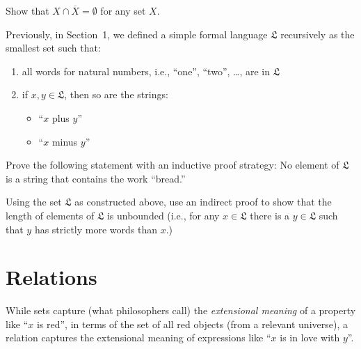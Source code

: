 \documentclass[nobib,nofonts]{tufte-handout}
\begin{document}
\bigskip
\noindent \colorbox{mygray}{\centering
  \begin{minipage}{1.0\textwidth}

    \begin{exercise}
      Show that $X \cap \overline{X} = \emptyset$ for any set $X$.
    \end{exercise}

    \begin{exercise}
      Previously, in Section~1, we defined a simple formal language $\mathfrak{L}$ recursively as the smallest set such that:
      \begin{enumerate}
        \item all words for natural numbers, i.e., ``one'', ``two'', \dots, are in $\mathfrak{L}$
        \item if $x, y \in \mathfrak{L}$, then so are the strings:
        \begin{multicols}{2}
          \begin{itemize}[]
            \item ``$x$ plus $y$''
            \item ``$x$ minus $y$''
          \end{itemize}
        \end{multicols}
      \end{enumerate}
      Prove the following statement with an inductive proof strategy: No element of $\mathfrak{L}$ is a string that contains the work ``bread.''
    \end{exercise}

    \begin{exercise}
      Using the set $\mathfrak{L}$ as constructed above, use an indirect proof to show that the length of elements of $\mathfrak{L}$ is unbounded (i.e., for any $x \in \mathfrak{L}$ there is a $y \in \mathfrak{L}$ such that $y$ has strictly more words than $x$.)
    \end{exercise}
  \end{minipage}
}

\newpage

\section{Relations}

While sets capture (what philosophers call) the \emph{extensional meaning} of a property like ``$x$ is red'', in terms of the set of all red objects (from a relevant universe), a relation captures the extensional meaning of expressions like ``$x$ is in love with $y$''.
\end{document}
